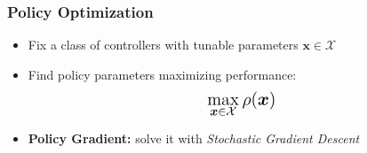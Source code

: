 \documentclass[aspectratio=169]{beamer}
\begin{document}
\begin{frame}
\begin{overlayarea}{\textwidth}{\textheight}
\frametitle{Policy Optimization}
\begin{itemize}
	\item<1-> Fix a class of controllers with tunable parameters $\boldsymbol{x}\in\mathcal{X}$
	\item<2-> Find policy parameters maximizing performance:
	\vspace{-.25cm}
	\[	\Large
		\max\limits_{\boldsymbol{x}\in\mathcal{X}} \rho(\boldsymbol{x})
	\]

	\item<3-> \textbf{Policy Gradient:} solve it with \emph{Stochastic Gradient Descent}
	\vspace{.25cm}
\end{itemize}
\end{overlayarea}
\end{frame}
\end{document}
